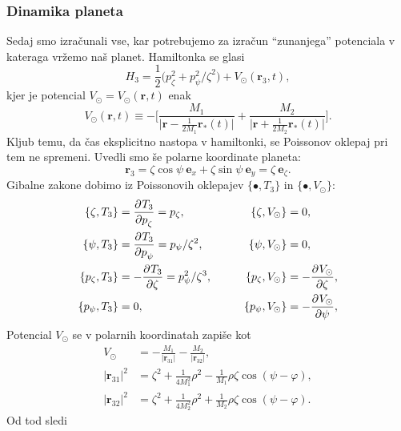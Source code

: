 \documentclass[12pt, a4paper]{article}
\renewcommand{\r}{
    \ensuremath{\mathbf{r}}
}
\newcommand{\ee}{
    \ensuremath{\mathbf{e}}
}
\newcommand{\der}[3][]{
    \ensuremath{ \frac{\partial^{#1} #2}{\partial #3^{#1}} }
}
\begin{document}
\subsubsection{Dinamika planeta}
Sedaj smo izra\v cunali vse, kar potrebujemo za izra\v cun "`zunanjega"' potenciala v kateraga vr\v zemo na\v s planet.
Hamiltonka se glasi
\begin{equation}
    H_3 = \frac{1}{2}\big(p_\zeta^2 + p_\psi^2/\zeta^2\big) + V_\odot(\r_3,t),
\end{equation}
kjer je potencial $V_\odot = V_\odot(\r, t)$ enak
\begin{equation}
    V_\odot (\r, t) \equiv -\Bigg[\frac{M_1}{\big|\r - \frac{1}{2M_1}\r_*(t)\big|}
        + \frac{M_2}{\big|\r + \frac{1}{2M_2}\r_*(t)\big|}\Bigg].
\end{equation}
Kljub temu, da \v cas eksplicitno nastopa v hamiltonki, se Poissonov oklepaj pri tem ne spremeni. Uvedli smo \v se
polarne koordinate planeta:
\[
    \r_3 = \zeta\cos\psi\ \ee_x + \zeta\sin\psi\ \ee_y = \zeta\ \ee_\zeta.
\]
Gibalne zakone dobimo iz Poissonovih oklepajev $\{\bullet, T_3\}$ in $\{\bullet, V_\odot\}$:
\begin{alignat}{3}
    \{\zeta, T_3\}        &= \der{T_3}{p_\zeta} = p_\zeta, \qquad&
    \{\zeta, V_\odot\}    &= 0, \qquad \notag \\
    \{\psi, T_3\}         &= \der{T_3}{p_\psi} = p_\psi/\zeta^2, \qquad&
    \{\psi, V_\odot\}     &= 0, \notag \\
	\{p_\zeta, T_3\} &= -\der{T_3}{\zeta} = p^2_\psi/\zeta^3, \qquad&
    \{p_\zeta, V_\odot\}  &= -\der{V_\odot}{\zeta}, \notag \\
	\{p_\psi, T_3\}       &= 0, \qquad&
    \{p_\psi, V_\odot\}   &= -\der{V_\odot}{\psi},
    \label{oklepaji}
\end{alignat}
Potencial $V_\odot$ se v polarnih koordinatah zapi\v se kot
\begin{align}
    V_\odot     &= -\frac{M_1}{|\r_{31}|} -\frac{M_2}{|\r_{32}|}, \\
    |\r_{31}|^2 &= \zeta^2 + \frac{1}{4M_1^2}\rho^2 - \frac{1}{M_1}\rho\zeta\cos(\psi - \varphi),
	\label{r31} \\
    |\r_{32}|^2 &= \zeta^2 + \frac{1}{4M_2^2}\rho^2 + \frac{1}{M_2}\rho\zeta\cos(\psi - \varphi).
	\label{r32}
\end{align}
Od tod sledi
\end{document}

